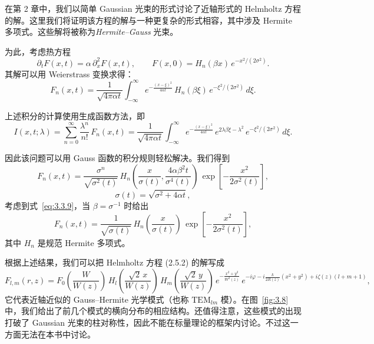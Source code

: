 在第 2 章中，我们以简单 Gaussian 光束的形式讨论了近轴形式的 Helmholtz 方程的解。这里我们将证明该方程的解与一种更复杂的形式相容，其中涉及 Hermite 多项式。这些解将被称为\emph{Hermite--Gauss} 光束。

为此，考虑热方程
\begin{equation}
\partial_t F(x,t)=\alpha\,\partial_x^2 F(x,t),\qquad
F(x,0)=H_n(\beta x)\,e^{-x^2/(2\sigma^2)}.
\label{eq:3.8.1}
\end{equation}
其解可以用 Weierstrass 变换求得：
\begin{equation}
F_n(x,t)=\frac{1}{\sqrt{4\pi\alpha t}}
\int_{-\infty}^{\infty}
e^{-\frac{(x-\xi)^2}{4\alpha t}}\,
H_n(\beta\xi)\,e^{-\xi^2/(2\sigma^2)}\,d\xi.
\label{eq:3.8.2}
\end{equation}

上述积分的计算使用生成函数方法，即
\[
I(x,t;\lambda)=\sum_{n=0}^{\infty}\frac{\lambda^n}{n!}\,F_n(x,t)
=\frac{1}{\sqrt{4\pi\alpha t}}
 \int_{-\infty}^{\infty}
 e^{-\frac{(x-\xi)^2}{4\alpha t}}\,
 e^{2\lambda\beta\xi-\lambda^2}\,
 e^{-\xi^2/(2\sigma^2)}\,d\xi.
\]

因此该问题可以用 Gauss 函数的积分规则轻松解决。我们得到
\[
F_n(x,t)=
\frac{\sigma^n}{\sqrt{\sigma^2(t)}}\,
H_n\!\left(\frac{x}{\sigma(t)},\frac{4\alpha\beta^2 t}{\sigma^4(t)}\right)\,
\exp\!\left[-\frac{x^2}{2\sigma^2(t)}\right],
\]
\begin{equation}
\sigma(t)=\sqrt{\sigma^2+4\alpha t},
\label{eq:3.8.4}
\end{equation}
考虑到式~\eqref{eq:3.3.9}，当 $\beta=\sigma^{-1}$ 时给出
\begin{equation}
F_n(x,t)=
\frac{1}{\sqrt{\sigma(t)}}\,
H_n\!\left(\frac{x}{\sigma(t)}\right)\,
\exp\!\left[-\frac{x^2}{2\sigma^2(t)}\right],
\label{eq:3.8.5}
\end{equation}
其中 $H_n$ 是规范 Hermite 多项式。

根据上述结果，我们可以把 Helmholtz 方程 (2.5.2) 的解写成
\begin{equation}
F_{l,m}(r,z)=
F_0\!\left(\frac{W}{W(z)}\right)\,
H_l\!\left(\frac{\sqrt{2}\,x}{W(z)}\right)\,
H_m\!\left(\frac{\sqrt{2}\,y}{W(z)}\right)\,
e^{-\frac{x^2+y^2}{W^2(z)}}\,
e^{-i\varphi-i\frac{k}{2R(z)}(x^2+y^2)+i\zeta(z)(l+m+1)},
\label{eq:3.8.6}
\end{equation}
它代表近轴近似的 Gauss--Hermite 光学模式（也称 $\mathrm{TEM}_{lm}$ 模）。在图~\ref{fig:3.8} 中，我们给出了前几个模式的横向分布的相应结构。还值得注意，这些模式的出现打破了 Gaussian 光束的柱对称性，因此不能在标量理论的框架内讨论。不过这一方面无法在本书中讨论。


